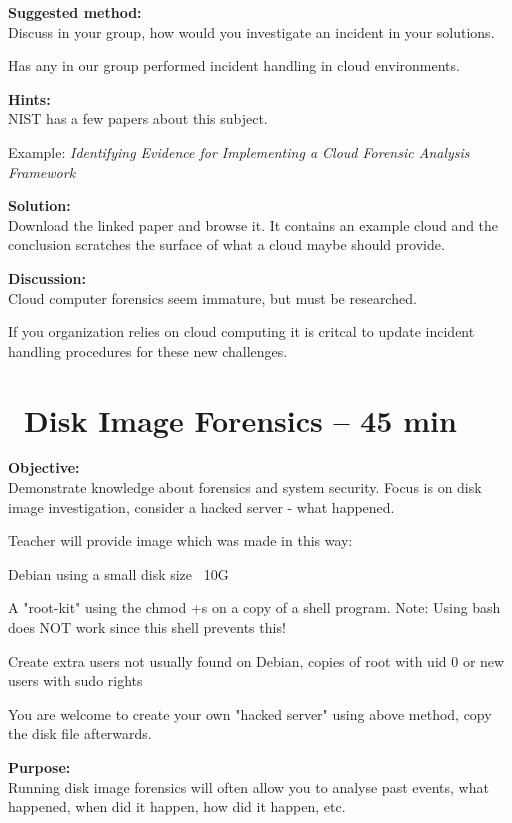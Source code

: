 \documentclass[a4paper,11pt,notitlepage]{report}
\begin{document}
{\bf Suggested method:}\\
Discuss in your group, how would you investigate an incident in your solutions.

Has any in our group performed incident handling in cloud environments.

{\bf Hints:}\\
NIST has a few papers about this subject.

Example:
\emph{Identifying Evidence for Implementing a Cloud Forensic Analysis Framework}

{\bf Solution:}\\
Download the linked paper and browse it. It contains an example cloud and the conclusion scratches the surface of what a cloud maybe should provide.

{\bf Discussion:}\\
Cloud computer forensics seem immature, but must be researched.

If you organization relies on cloud computing it is critcal to update incident handling procedures for these new challenges.



\chapter{\faExclamationTriangle\ Disk Image Forensics -- 45 min}
\label{ex:disk-image-forensics}

{\bf Objective:}\\
Demonstrate knowledge about forensics and system security. Focus is on disk image investigation, consider a hacked server - what happened.

Teacher will provide image which was made in this way:
\begin{list2}
\item Debian using a small disk size ~10G
\item A "root-kit" using the chmod +s on a copy of a shell program. Note: Using bash does NOT work since this shell prevents this!
\item Create extra users not usually found on Debian, copies of root with uid 0 or new users with sudo rights
\end{list2}

You are welcome to create your own "hacked server" using above method, copy the disk file afterwards.


{\bf Purpose:}\\
Running disk image forensics will often allow you to analyse past events, what happened, when did it happen, how did it happen, etc.
\end{document}
